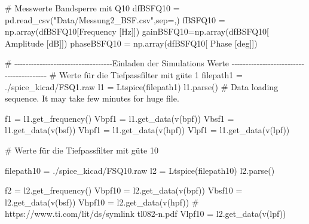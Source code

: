 \documentclass[
  ngerman,
  letterpaper,
  DIV=11]{scrreprt}
\newenvironment{Shaded}{}{}
\newcommand{\CommentTok}[1]{\textcolor[rgb]{0.42,0.45,0.49}{#1}}
\newcommand{\NormalTok}[1]{\textcolor[rgb]{0.14,0.16,0.18}{#1}}
\newcommand{\OperatorTok}[1]{\textcolor[rgb]{0.14,0.16,0.18}{#1}}
\newcommand{\StringTok}[1]{\textcolor[rgb]{0.01,0.18,0.38}{#1}}
\begin{document}
\begin{Shaded}
\begin{Highlighting}[]
\CommentTok{\# Messwerte Bandsperre mit Q10}
\NormalTok{dfBSFQ10 }\OperatorTok{=}\NormalTok{ pd.read\_csv(}\StringTok{"Data/Messung2\_BSF.csv"}\NormalTok{,sep}\OperatorTok{=}\StringTok{\textquotesingle{},\textquotesingle{}}\NormalTok{)}
\NormalTok{fBSFQ10 }\OperatorTok{=}\NormalTok{ np.array(dfBSFQ10[}\StringTok{\textquotesingle{}Frequency [Hz]\textquotesingle{}}\NormalTok{])}
\NormalTok{gainBSFQ10}\OperatorTok{=}\NormalTok{np.array(dfBSFQ10[}\StringTok{\textquotesingle{} Amplitude [dB]\textquotesingle{}}\NormalTok{])}
\NormalTok{phaseBSFQ10 }\OperatorTok{=}\NormalTok{ np.array(dfBSFQ10[}\StringTok{\textquotesingle{} Phase [deg]\textquotesingle{}}\NormalTok{])}
\end{Highlighting}
\end{Shaded}

\begin{Shaded}
\begin{Highlighting}[]
\CommentTok{\# {-}{-}{-}{-}{-}{-}{-}{-}{-}{-}{-}{-}{-}{-}{-}{-}{-}{-}{-}{-}{-}{-}{-}{-}{-}{-}{-}{-}{-}{-}{-}{-}{-}{-}{-}Einladen der Simulations Werte {-}{-}{-}{-}{-}{-}{-}{-}{-}{-}{-}{-}{-}{-}{-}{-}{-}{-}{-}{-}{-}{-}{-}{-}{-}{-}{-}{-}{-}{-}{-}{-}{-}{-}{-}{-}{-}{-}{-}{-}{-}}
\CommentTok{\# Werte für die Tiefpassfilter mit güte 1}
\NormalTok{filepath1 }\OperatorTok{=} \StringTok{\textquotesingle{}./spice\_kicad/FSQ1.raw\textquotesingle{}}
\NormalTok{l1 }\OperatorTok{=}\NormalTok{ Ltspice(filepath1)}
\NormalTok{l1.parse() }\CommentTok{\# Data loading sequence. It may take few minutes for huge file.}

\NormalTok{f1 }\OperatorTok{=}\NormalTok{ l1.get\_frequency()}
\NormalTok{Vbpf1 }\OperatorTok{=}\NormalTok{ l1.get\_data(}\StringTok{\textquotesingle{}v(bpf)\textquotesingle{}}\NormalTok{)}
\NormalTok{Vbsf1 }\OperatorTok{=}\NormalTok{ l1.get\_data(}\StringTok{\textquotesingle{}v(bsf)\textquotesingle{}}\NormalTok{)}
\NormalTok{Vhpf1 }\OperatorTok{=}\NormalTok{ l1.get\_data(}\StringTok{\textquotesingle{}v(hpf)\textquotesingle{}}\NormalTok{)}
\NormalTok{Vlpf1 }\OperatorTok{=}\NormalTok{ l1.get\_data(}\StringTok{\textquotesingle{}v(lpf)\textquotesingle{}}\NormalTok{)}

\CommentTok{\# Werte für die Tiefpassfilter mit güte 10}

\NormalTok{filepath10 }\OperatorTok{=} \StringTok{\textquotesingle{}./spice\_kicad/FSQ10.raw\textquotesingle{}}
\NormalTok{l2 }\OperatorTok{=}\NormalTok{ Ltspice(filepath10)}
\NormalTok{l2.parse()}

\NormalTok{f2 }\OperatorTok{=}\NormalTok{ l2.get\_frequency()}
\NormalTok{Vbpf10 }\OperatorTok{=}\NormalTok{ l2.get\_data(}\StringTok{\textquotesingle{}v(bpf)\textquotesingle{}}\NormalTok{)}
\NormalTok{Vbsf10 }\OperatorTok{=}\NormalTok{ l2.get\_data(}\StringTok{\textquotesingle{}v(bsf)\textquotesingle{}}\NormalTok{)}
\NormalTok{Vhpf10 }\OperatorTok{=}\NormalTok{ l2.get\_data(}\StringTok{\textquotesingle{}v(hpf)\textquotesingle{}}\NormalTok{)  }\CommentTok{\# https://www.ti.com/lit/ds/symlink tl082{-}n.pdf}
\NormalTok{Vlpf10 }\OperatorTok{=}\NormalTok{ l2.get\_data(}\StringTok{\textquotesingle{}v(lpf)\textquotesingle{}}\NormalTok{)}
\end{Highlighting}
\end{Shaded}
\end{document}

